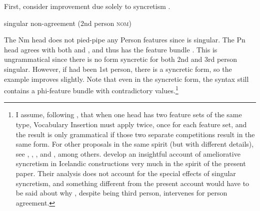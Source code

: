 \documentclass[output=paper]{langscibook}
\begin{document}
First, consider improvement due solely to syncretism \citep[33]{SigurTHsson:1996va}. 

\begin{exe}
\z
\end{exe}

\ea \datnom singular non-agreement (2nd person \textsc{nom})\smallskip\\
\z

The Nm head does not pied-pipe any Person features since  is singular. The Pn head agrees with both  and , and thus has the feature bundle . This is ungrammatical since there is no form syncretic for both 2nd and 3rd person singular. However, if  had been 1st person, there is a syncretic form, so the example improves slightly. Note that even in the syncretic form, the syntax still contains a phi-feature bundle with contradictory values.\footnote{I assume, following \citet{Bjorkman2016}, that when one head has two feature sets of the same type, Vocabulary Insertion must apply twice, once for each feature set, and the result is only grammatical if those two separate competitions result in the same form. For other proposals in the same spirit (but with different details), see \citet{citko2005nature}, \citet{Kratzer:2009jq}, \citet{bhatt2013locating}, \citet{Asarina2013} and  \citet{CoonKeine2020}, among others. \citet{CoonKeine2020} develop an insightful account of ameliorative syncretism in Icelandic  constructions very much in the spirit of the present paper. Their analysis  does not account for the special effects of singular \sti syncretism, and something different from the present account would have to be said about why \stin{}, despite being third person, intervenes for person agreement.  } 
\end{document}

